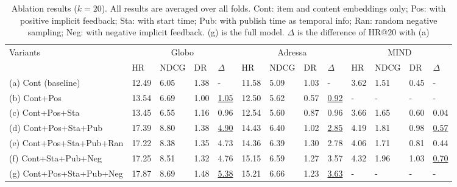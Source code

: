 \begin{table}[!htp]\setlength{\tabcolsep}{0.8pt}
  \caption{Ablation results ($k=20$). All results are averaged over all folds.
Cont: item and content embeddings only; Pos: with positive implicit feedback; Sta: with start time; Pub: with publish time as temporal info; Ran: random negative sampling;
Neg: with negative implicit feedback. (g) is the full model. $\Delta$ is the difference of HR@20 with (a)}
  \label{tb:ablation}
  \begin{threeparttable}
  \centering
  \begin{tabular}{p{3.7cm}|p{1.1cm}<{\centering}|p{1.1cm}<{\centering}|p{1.1cm}<{\centering}|p{1.1cm}<{\centering}|p{1.1cm}<{\centering}|p{1.1cm}<{\centering}|p{1.1cm}<{\centering}|p{1.1cm}<{\centering}|p{1.1cm}<{\centering}|p{1.1cm}<{\centering}|p{1.1cm}<{\centering}|p{1.1cm}<{\centering}}
  \toprule
  \multirow{2}{*}{Variants} & \multicolumn{4}{c|}{Globo} & \multicolumn{4}{c|}{Adressa} & \multicolumn{4}{c}{MIND} \\
  \cline{2-13}
  & HR & NDCG & DR & $\Delta$ & HR & NDCG & DR & $\Delta$ & HR & NDCG & DR & $\Delta$ \\
  \midrule
  (a) Cont (baseline) & 12.49 & 6.05 & 1.38 & - & 11.58 & 5.09 & 1.03 & - & 3.62 & 1.51 & 0.45 & -\\
  (b) Cont+Pos & 13.54 & 6.69 & 1.00 & \uline{1.05} & 12.50 & 5.62 & 0.57 & \uline{0.92} & - & - & - & - \\
  (c) Cont+Pos+Sta & 13.45 & 6.55 & 1.16 & 0.96 & 12.54 & 5.60 & 0.87 & 0.96 & 3.66 & 1.65 & 0.60 & 0.04\\
  (d) Cont+Pos+Sta+Pub & 17.39 & 8.80 & 1.38 & \uline{4.90} & 14.43 & 6.40 & 1.02 & \uline{2.85} & 4.19 & 1.81 & 0.98 & \uline{0.57}\\
  (e) Cont+Pos+Sta+Pub+Ran & 17.22 & 8.38 & 1.35 & 4.73 & 14.36 & 6.39 & 1.30 & 2.78 & 4.06 & 1.71 & 0.81 & 0.44\\
  \midrule
  (f) Cont+Sta+Pub+Neg & 17.25 & 8.51 & 1.32 & 4.76 & 15.15 & 6.59 & 1.27 & 3.57 & 4.32 & 1.96 & 1.03 & \uline{0.70} \\
  (g) Cont+Pos+Sta+Pub+Neg & 17.87 & 8.69 & 1.48 & \uline{5.38} & 15.21 & 6.66 & 1.23 & \uline{3.63} & - & - & - & - \\
  \bottomrule
\end{tabular}
\end{threeparttable}
\end{table}

